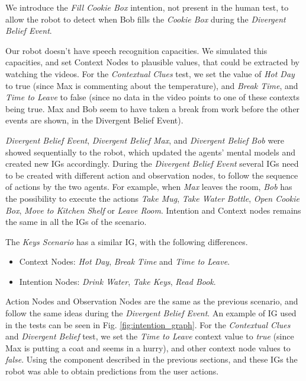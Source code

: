 We introduce the \textit{Fill Cookie Box} intention, not present in the human test, to allow the robot to detect when Bob fills the \textit{Cookie Box} during the \textit{Divergent Belief Event}.

Our robot doesn't have speech recognition capacities. We simulated this capacities, and set Context Nodes to plausible values, that could be extracted by watching the videos. For the \textit{Contextual Clues} test, we set the value of \textit{Hot Day} to true (since Max is commenting about the temperature), and \textit{Break Time}, and \textit{Time to Leave} to false (since no data in the video points to one of these contexts being true. Max and Bob seem to have taken a break from work before the other events are shown, in the Divergent Belief Event).

\textit{Divergent Belief Event}, \textit{Divergent Belief Max}, and \textit{Divergent Belief Bob} were showed sequentially to the robot, which updated the agents' mental models and created new IGs accordingly. During the \textit{Divergent Belief Event} several IGs need to be created with different action and observation nodes, to follow the sequence of actions by the two agents. For example, when \textit{Max} leaves the room, \textit{Bob} has the possibility to execute the actions \textit{Take Mug}, \textit{Take Water Bottle}, \textit{Open Cookie Box}, \textit{Move to Kitchen Shelf} or \textit{Leave Room}. Intention and Context nodes remains the same in all the IGs of the scenario.


The \textit{Keys Scenario} has a similar IG, with the following differences.
\begin{itemize}
\item Context Nodes: \textit{Hot Day}, \textit{Break Time} and \textit{Time to Leave}.
\item Intention Nodes: \textit{Drink Water}, \textit{Take Keys}, \textit{Read Book}.
\end{itemize}

Action Nodes and Observation Nodes are the same as the previous scenario, and follow the same ideas during the \textit{Divergent Belief Event}. An example of IG used in the tests can be seen in Fig. \ref{fig:intention_graph}. For the \textit{Contextual Clues} and \textit{Divergent Belief} test, we set the \textit{Time to Leave} context value to \textit{true} (since Max is putting a coat and seems in a hurry), and other context node values to \textit{false}. Using the component described in the previous sections, and these IGs the robot was able to obtain predictions from the user actions.

